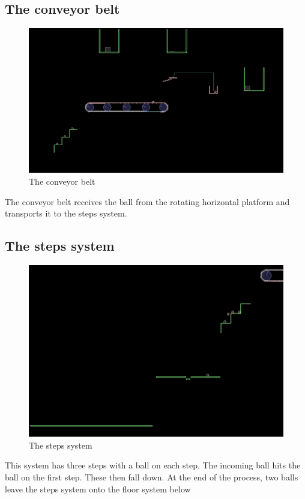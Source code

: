 \documentclass[a4paper,11pt]{article}
\begin{document}
  \subsection{The conveyor belt}
	\begin{figure}
	\includegraphics[scale=0.35]{14_ball_on_conveyor_belt.png}
	\caption{The conveyor belt}
	\end{figure}  

	The conveyor belt receives the ball from the rotating horizontal platform and transports it to the steps system.

  \subsection{The steps system}
  	\begin{figure}
	\includegraphics[scale=0.35]{15_balls_on_steps.png}
	\caption{The steps system}
	\end{figure}  
	This system has three steps with a ball on each step. The incoming ball hits the ball on the first step. These then fall down. At the end of the process, two balls leave the steps system onto the floor system below
\end{document}
